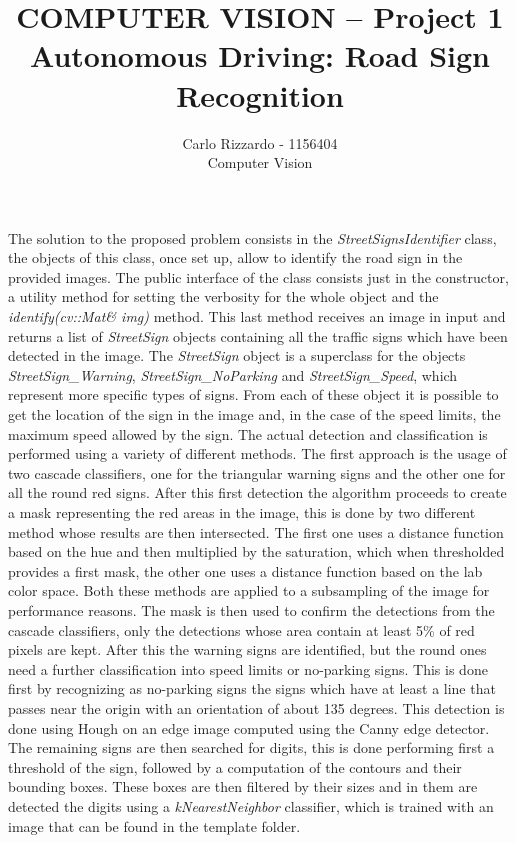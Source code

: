 \documentclass[12pt]{article}
\begin{document}
 
 
 
\title{COMPUTER VISION – Project 1
Autonomous Driving: Road Sign Recognition}%
\author{Carlo Rizzardo - 1156404\\ %
Computer Vision} %
 
\maketitle


The solution to the proposed problem consists in the \textit{StreetSignsIdentifier} class, the objects of this class, once set up, allow to identify the road sign in the provided images.
The public interface of the class consists just in the constructor, a utility method for setting the verbosity for the whole object and
the \textit{identify(cv::Mat\& img)} method. This last method receives an image in input and returns a list of \textit{StreetSign} objects containing all the traffic signs which have been detected in the image. The \textit{StreetSign} object is a superclass for the objects \textit{StreetSign\_Warning}, \textit{StreetSign\_NoParking} and \textit{StreetSign\_Speed}, which represent 
more specific types of signs. From each of these object it is possible to get the location of the sign  in the image and, in the case of the speed limits, the maximum speed allowed by the sign.
The actual detection and classification is performed using a variety of different methods. The first approach is the usage of two cascade classifiers, one for the triangular warning signs and the other one for all the round red signs.
After this first detection the algorithm proceeds to create a mask representing the red areas in the image, this is done by two different method whose results are then intersected. The first one uses a distance function based on the hue and then
multiplied by the saturation, which when thresholded provides a first mask, the other one uses a distance function based on the lab color space. Both these methods are applied to a subsampling of the image for performance reasons.
The mask is then used to confirm the detections from the cascade classifiers, only the detections whose area contain at least 5\% of red pixels are kept.
After this the warning signs are identified, but the round ones need a further classification into speed limits or no-parking signs. This is done first by recognizing as no-parking signs the signs which have at least a line that passes near the origin with an orientation of about 135 degrees.
This detection is done using Hough on an edge image computed using the Canny edge detector. The remaining signs are then searched for digits, this is done performing first a threshold of the sign, followed by a computation of the contours and their bounding boxes. These boxes are then filtered by their sizes and in them are detected the digits using a \textit{kNearestNeighbor} classifier, which is trained with an image that can be found in the template folder.
\end{document}
